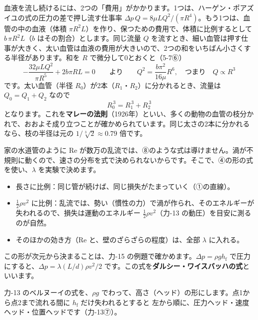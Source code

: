 \begin{motto}[4]
血液を流し続けるには、2つの「費用」がかかります。1つは、ハーゲン・ポアズイユの式の圧力の差で押し流す仕事率 $\Delta p\,Q=8\mu LQ^2/(\pi R^4)$。もう1つは、血管の中の血液（体積 $\pi R^2L$）を作り、保つための費用で、体積に比例するとして $b\,\pi R^2L$（$b$ はその割合）とします。同じ流量 $Q$ を流すとき、細い血管は押す仕事が大きく、太い血管は血液の費用が大きいので、2つの和をいちばん小さくする半径があります。和を $R$ で微分して0とおくと（5-7⑥）
\[ -\frac{32\mu LQ^2}{\pi R^5}+2b\pi RL=0\qquad\text{より}\qquad Q^2=\frac{b\pi^2}{16\mu}R^6,\quad\text{つまり}\quad Q\propto R^3 \]
です。太い血管（半径 $R_0$）が2本（$R_1$・$R_2$）に分かれるとき、流量は $Q_0=Q_1+Q_2$ なので
\[ R_0^{\,3}=R_1^{\,3}+R_2^{\,3} \]
となります。これを\textbf{マレーの法則}（1926年）といい、多くの動物の血管の枝分かれで、おおよそ成り立つことが確かめられています。同じ太さの2本に分かれるなら、枝の半径は元の $1/\sqrt[3]2\approx0.79$ 倍です。
\end{motto}

\label{ph:力-14:sec9}家の水道管のように Re が数万の乱流では、⑧のような式は導けません。渦が不規則に動くので、速さの分布を式で決められないからです。そこで、④の形の式を使い、$\lambda$ を実験で決めます。

\begin{itemize}[leftmargin=1.2\zw, itemsep=1pt, topsep=1pt, label={\color{bkTheme}●}]
\item 長さに比例：同じ管が続けば、同じ損失がたまっていく（①の直線）。
\item $\tfrac{1}{2}\rho v^2$ に比例：乱流では、勢い（慣性の力）で渦が作られ、そのエネルギーが失われるので、損失は運動のエネルギー $\tfrac{1}{2}\rho v^2$（力-13 の動圧）を目安に測るのが自然。
\item そのほかの効き方（Re と、壁のざらざらの程度）は、全部 $\lambda$ に入れる。
\end{itemize}
この形が次元から決まることは、力-15 の例題で確かめます。$\Delta p=\rho gh_{\mathrm f}$ で圧力にすると、$\Delta p=\lambda (L/d)\rho v^2/2$ です。この式を\textbf{ダルシー・ワイスバッハの式}といいます。\label{ph:力-14:dw}

力-13 のベルヌーイの式を、$\rho g$ でわって、高さ（ヘッド）の形にします。点1から点2まで流れる間に $h_{\mathrm f}$ だけ失われるとすると
\noindent 左から順に、圧力ヘッド・速度ヘッド・位置ヘッドです（力-13⑦）。

